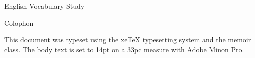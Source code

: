 \documentclass[a4paper,14pt]{memoir}
\begin{document}
\frontmatter

\cleardoublepage
\pagestyle{empty}
\null\vfil  %
\begin{center}
  \Huge\textsf{English Vocabulary Study} \par \vspace{0.5in}
\end{center}

\clearpage
\pagestyle{empty}
\null\vfil
\vfil

\clearpage
{}
\pagestyle{headings}

\tableofcontents*   %


\mainmatter
{}
\pagestyle{ocd}








\backmatter

\printindex

\cleardoublepage
\pagestyle{empty}
\null\vfil

\begin{adjustwidth}{1in}{1in}
\begin{center}
{\Large\textsf{Colophon}}
\end{center}
\begin{center}
  This document was typeset using the xeTeX typesetting system
  and the memoir class. The body text is set to 14pt on a
  33pc measure with Adobe Minon Pro. 
\end{center}
\end{adjustwidth}

\vfil
\end{document}
